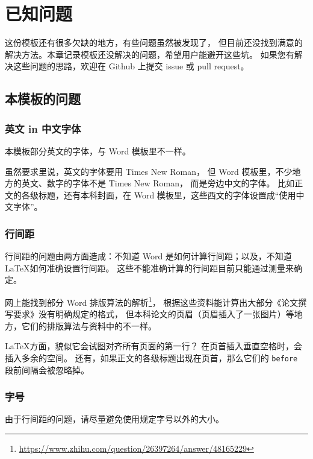 \chapter{已知问题}

这份模板还有很多欠缺的地方，有些问题虽然被发现了，
但目前还没找到满意的解决方法。本章记录模板还没解决的问题，希望用户能避开这些坑。
如果您有解决这些问题的思路，欢迎在 Github 上提交 issue 或 pull request。

\section{本模板的问题}

\subsection{英文 in 中文字体}

本模板部分英文的字体，与 Word 模板里不一样。

虽然要求里说，英文的字体要用 Times New Roman\textsuperscript{\textregistered}，
但 Word 模板里，不少地方的英文、数字的字体不是 Times New Roman\textsuperscript{\textregistered}，
而是旁边中文的字体。
比如正文的各级标题，还有本科封面，在 Word 模板里，这些西文的字体设置成“使用中文字体”。

\subsection{行间距}

行间距的问题由两方面造成：不知道 Word 是如何计算行间距；以及，不知道 \LaTeX 如何准确设置行间距。
这些不能准确计算的行间距目前只能通过测量来确定。


网上能找到部分 Word 排版算法的解析\footnote{\url{https://www.zhihu.com/question/26397264/answer/48165229}}，
根据这些资料能计算出大部分《论文撰写要求》没有明确规定的格式，
但本科论文的页眉（页眉插入了一张图片）等地方，它们的排版算法与资料中的不一样。

\LaTeX 方面，貌似它会试图对齐所有页面的第一行？
在页首插入垂直空格时，会插入多余的空间。
还有，如果正文的各级标题出现在页首，那么它们的 \texttt{before} 段前间隔会被忽略掉。

\subsection{字号}

由于行间距的问题，请尽量避免使用规定字号以外的大小。

